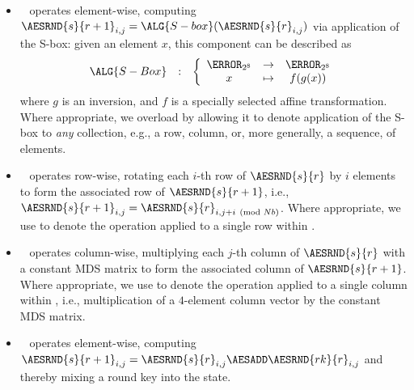 \begin{itemize}

\item {}
      ~\cite[Section 5.1.1]{FIPS:197}
      operates element-wise,
      computing
      $\AESRND{s}{r+1}_{i,j} = \ALG{S-box}( \AESRND{s}{r}_{i,j} )$
      via application of the S-box:
      given an element $x$, this component can be described as
      \[
      \begin{array}{lcl}
      \ALG{S-Box} &:& \left\{\begin{array}{ccc}
                             \F_{2^8} &\rightarrow& \F_{2^8} \\
                             x        &\mapsto    & f(g(x))  \\
                             \end{array}
                      \right.
      \end{array}
      \]
      where 
      $g$ is an inversion, 
      and 
      $f$ is a specially selected affine transformation.
      Where appropriate,
      we overload  by allowing it to denote application 
      of the S-box to {\em any} collection, 
      e.g., a row, column, or, more generally, a sequence, 
      of elements.

\item {}
      ~\cite[Section 5.1.2]{FIPS:197}
      operates     row-wise,
      rotating each 
      $i$-th row 
      of 
      $\AESRND{s}{r  }$
      by $i$ elements
      to form 
      the associated row    of
      $\AESRND{s}{r+1}$,
      i.e.,
      $\AESRND{s}{r+1}_{i,j} = \AESRND{s}{r}_{i,j + i \pmod{Nb}}$.
      Where appropriate,
      we use
      to denote
      the operation applied to a single 
      row
      within .

\item {}
      ~\cite[Section 5.1.3]{FIPS:197}
      operates  column-wise,
      multiplying each 
      $j$-th column
      of 
      $\AESRND{s}{r  }$
      with a constant MDS matrix
      to form 
      the associated column of
      $\AESRND{s}{r+1}$.
      Where appropriate,
      we use
      to denote
      the operation applied to a single 
      column 
      within , i.e., multiplication of a $4$-element 
      column vector by the constant MDS matrix.
      
\item {}
      ~\cite[Section 5.1.4]{FIPS:197}
      operates element-wise,
      computing
      $\AESRND{s}{r+1}_{i,j} = \AESRND{s}{r}_{i,j} \AESADD \AESRND{rk}{r}_{i,j}$ 
      and thereby mixing a round key into the state.

\end{itemize}

